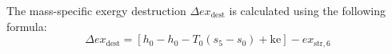 The mass-specific exergy destruction \( \Delta ex_{\text{dest}} \) is calculated using the following formula:  
\[
\Delta ex_{\text{dest}} = \left[ h_0 - h_0 - T_0 (s_5 - s_0) + \text{ke} \right] - ex_{\text{str},6}
\]